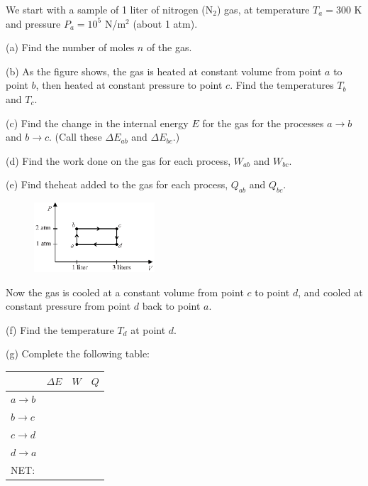 We start with a sample of 1 liter of nitrogen ($\textrm{N}_2$) gas, at temperature $T_a = 300$ K and pressure $P_a = 10^5$ N/m$^2$ (about 1 atm).

(a) Find the number of moles $n$ of the gas.
\answerspace{1.0in}

(b) As the figure shows, the gas is heated at constant volume from point $a$ to point $b$, then heated at constant pressure to point $c$.  Find the temperatures $T_b$ and $T_c$.  
\answerspace{1.4in}

(c) Find the change in the internal energy $E$ for the gas for the processes $a \rightarrow b$ and $b \rightarrow c$.  (Call these $\Delta E_{ab}$ and $\Delta E_{bc}$.)
\answerspace{1.5in}

\pagebreak
(d) Find the work done on the gas for each process, $W_{ab}$ and $W_{bc}$.  
\answerspace{1.3in}

(e) Find theheat added to the gas for each process, $Q_{ab}$ and $Q_{bc}$.  
\answerspace{1.3in}

\begin{figure}
  \vspace{-0.2 in}
  \includegraphics[width=0.4\textwidth]{ideal_gas_cycles/square_cycle2.eps}
\end{figure}

Now the gas is cooled at a constant volume from point $c$ to point $d$, and cooled at constant pressure from point $d$ back to point $a$.  

(f) Find the temperature $T_d$ at point $d$.
\answerspace{1.5in}

(g) Complete the following table:


\vspace{0.1 in}
\renewcommand{\arraystretch}{2.0}
\begin{tabular}{| C{1in} |C{1in} | C{1in} | C{1in} |}
\hline
& $\Delta E$ & $W$ & $Q$ \\ \hline
$a \rightarrow b$ & & & \\ \hline
$b \rightarrow c$ & & & \\ \hline
$c \rightarrow d$ & & & \\ \hline
$d \rightarrow a$ & & & \\ \hline
\hline
NET: & & & \\ \hline
\end{tabular}
\renewcommand{\arraystretch}{1.0}

